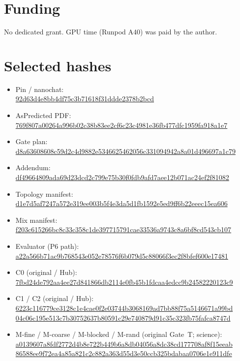 \documentclass[11pt,a4paper]{article}
\newcommand{\sha}[1]{{\footnotesize\ttfamily\url{#1}}}
\begin{document}
\section*{Funding}
No dedicated grant. GPU time (Runpod A40) was paid by the author.

\appendix
\section{Selected hashes}
\label{app:hashes}
\begin{itemize}[leftmargin=1.6em,itemsep=0.35em]
\item Pin / nanochat:\\
\sha{92d63d4e8bb4df75c3b71618f31ddde2378b2bcd}
\item AsPredicted PDF:\\
\sha{769f807a00264a996b02c38b83ee2cf6c23c4981e36fb477dfc1959fa918a1e7}
\item Gate plan:\\
\sha{d8a63608608c59d2c4d9882e5346625462056c331094942a8a01d496697a1c79}
\item Addendum:\\
\sha{df49664809ada69d23dcd2c799e75b30f0fdb9afd7aee12b071ac24ef2f81082}
\item Topology manifest:\\
\sha{d1e7d5af7247a572e319ee003b5f4e3da5d1fb1592e5ed9ff6b22eeec15ea606}
\item Mix manifest:\\
\sha{f203c615266bc8c33c358c1de397715791cae33536a9743c8a6bf8cd543cb107}
\item Evaluator (P6 path):\\
\sha{a22a566b71ac9b768543e052e78576f6b079d5c88066f3ec2f8bfef600e17481}
\item C0 (original / Hub):\\
\sha{7fbd24de792aa4ee27d841866db2114e0fb45b1fdcaa4edcc9b24582220123c9}
\item C1 / C2 (original / Hub):\\
\sha{6223c116779ce3128c1e4cae0f2e03744b3068169ad7bb88f75a5146671a99bd}\\
\sha{04c06c195e513c7b30752637b80591c29e740879d91c35c323fb75fafca8747d}
\item M-fine / M-coarse / M-blocked / M-rand (original Gate~T; science):\\
\sha{a0139607a8fdf2772d4b8e722b449b6a8db04056a8dc38cd177708af8f15eeab}\\
\sha{86588ee9f72ea4a85a821c2c882a363d55d3e50ccb325bdabaa0706e1e911dfe}\\

\end{itemize}
\end{document}
